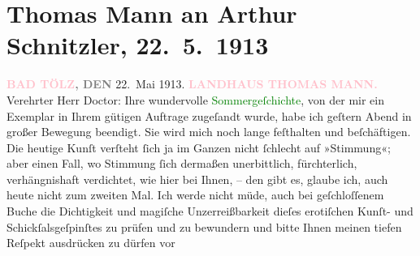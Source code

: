 

               \section[Thomas Mann an Arthur Schnitzler, 22. 5. 1913]{ Thomas Mann an Arthur Schnitzler, 22. 5. 1913}\nopagebreak{}\rehead{ }\normalsize\beginnumbering{} \toendnotes[C]{\smallbreak\pagebreak[2]} 
\toendnotes[C]{\smallbreak}\pstart
           \noindent{}\raggedleft{}{\pb}\textcolor{gray}{\textbf{\textcolor{pink}{BAD TÖLZ}{}\ledrightnote{\textcolor{pink}{Bad Tölz}}, DEN}}{ }22. Mai 1913.\pend
           \pstart
           \noindent{}\raggedleft{}\textcolor{gray}{\textbf{\textcolor{pink}{LANDHAUS THOMAS MANN.}{}\ledrightnote{\textcolor{pink}{Thomas Mann Villa}}}}\pend
           \pstart{}Verehrter Herr Doctor:\pend\pstart
           Ihre wundervolle \textcolor{green}{Sommergeſchichte}{}, von der mir ein Exemplar in Ihrem gütigen Auftrage
                    zugeſandt wurde, habe ich geſtern Abend in großer Bewegung beendigt. Sie wird
                    mich noch lange feſthalten und beſchäftigen. Die heutige Kunſt verſteht ſich ja
                    im Ganzen nicht ſchlecht auf »Stimmung«; aber einen Fall, wo Stimmung ſich
                    dermaßen unerbittlich, fürchterlich, verhängnishaft verdichtet, wie hier bei
                    Ihnen, – den gibt es, glaube ich, auch heute {\pb}nicht zum zweiten Mal. Ich werde
                    nicht müde, auch bei geſchloſſenem Buche die Dichtigkeit und magiſche
                    Unzerreißbarkeit dieſes erotiſchen Kunſt- und Schickſalsgeſpinſtes zu prüfen und
                    zu bewundern und bitte Ihnen meinen tiefen Reſpekt ausdrücken zu dürfen vor
